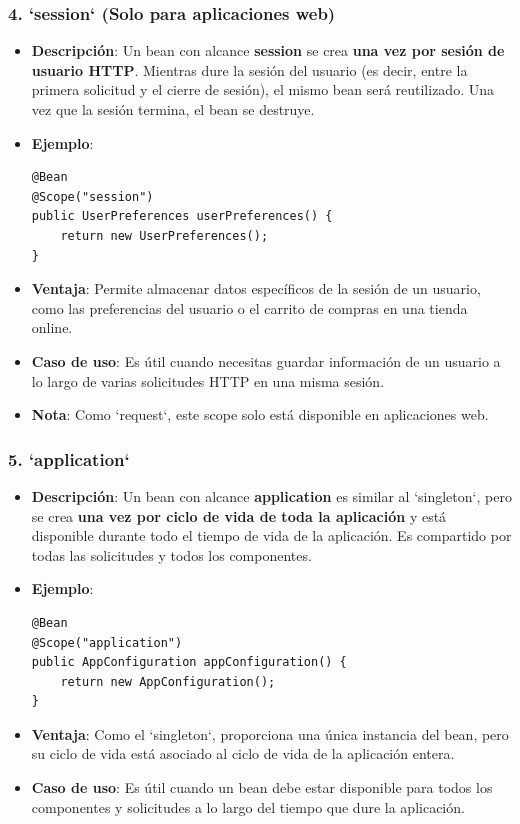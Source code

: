 \documentclass[11pt]{article}
\begin{document}
\subsubsection{4. \textbf{\textbf{`session`}} (Solo para aplicaciones web)}
\label{sec:org75e43cf}
\begin{itemize}
\item \textbf{\textbf{Descripción}}: Un bean con alcance \textbf{\textbf{session}} se crea \textbf{\textbf{una vez por sesión de usuario HTTP}}. Mientras dure la sesión del usuario (es decir, entre la primera solicitud y el cierre de sesión), el mismo bean será reutilizado. Una vez que la sesión termina, el bean se destruye.

\item \textbf{\textbf{Ejemplo}}:
\begin{verbatim}
@Bean
@Scope("session")
public UserPreferences userPreferences() {
    return new UserPreferences();
}
\end{verbatim}

\item \textbf{\textbf{Ventaja}}: Permite almacenar datos específicos de la sesión de un usuario, como las preferencias del usuario o el carrito de compras en una tienda online.
\item \textbf{\textbf{Caso de uso}}: Es útil cuando necesitas guardar información de un usuario a lo largo de varias solicitudes HTTP en una misma sesión.
\item \textbf{\textbf{Nota}}: Como `request`, este scope solo está disponible en aplicaciones web.
\end{itemize}

\subsubsection{5. \textbf{\textbf{`application`}}}
\label{sec:org835bf50}
\begin{itemize}
\item \textbf{\textbf{Descripción}}: Un bean con alcance \textbf{\textbf{application}} es similar al `singleton`, pero se crea \textbf{\textbf{una vez por ciclo de vida de toda la aplicación}} y está disponible durante todo el tiempo de vida de la aplicación. Es compartido por todas las solicitudes y todos los componentes.

\item \textbf{\textbf{Ejemplo}}:
\begin{verbatim}
@Bean
@Scope("application")
public AppConfiguration appConfiguration() {
    return new AppConfiguration();
}
\end{verbatim}

\item \textbf{\textbf{Ventaja}}: Como el `singleton`, proporciona una única instancia del bean, pero su ciclo de vida está asociado al ciclo de vida de la aplicación entera.
\item \textbf{\textbf{Caso de uso}}: Es útil cuando un bean debe estar disponible para todos los componentes y solicitudes a lo largo del tiempo que dure la aplicación.
\end{itemize}
\end{document}
